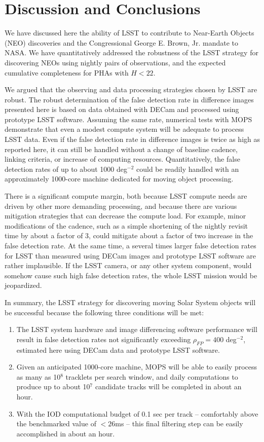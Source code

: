 

\section{Discussion and Conclusions\label{sec:discussion}}

We have discussed here the ability of LSST to contribute to Near-Earth Objects (NEO) discoveries and
the Congressional George E. Brown, Jr. mandate to NASA. We have quantitatively addressed
the robustness of the LSST strategy for discovering NEOs using nightly pairs of observations, and
the expected cumulative completeness for PHAs with $H<22$.

We argued that the observing and data processing strategies chosen by LSST are robust. The
robust determination of the false detection rate in difference images presented here is based
on data obtained with DECam and processed using prototype LSST software. Assuming the same rate,
numerical tests with MOPS demonstrate that even a modest compute system will be adequate to
process LSST data. Even if the false detection rate in difference images is twice as high as
reported here, it can still be handled without a change of baseline cadence, linking criteria, or
increase of computing resources. Quantitatively, the false detection rates of up to about
1000 deg$^{-2}$ could be readily handled with an approximately 1000-core machine dedicated for
moving object processing.

There is a significant compute margin, both because LSST compute needs are driven by other more
demanding processing, and because there are various mitigation strategies that can decrease the
compute load. For example, minor modifications of the cadence, such as a simple shortening
of the nightly revisit time by about a factor of 3, could mitigate about a factor of two increase in
the false detection rate. At the same time, a several times larger false detection rates for LSST
than measured using DECam images and prototype LSST software are rather implausible. If the
LSST camera, or any other system component, would somehow cause such high false detection rates,
the whole LSST mission would be jeopardized.

In summary, the LSST strategy for discovering moving Solar System objects will be successful
because the following three conditions will be met:
\begin{enumerate}
\item The LSST system hardware and image differencing software performance will result in false detection
          rates not significantly exceeding $\rho_{FP} =  400$ deg$^{-2}$, estimated here using DECam data
          and prototype LSST software.
\item Given an anticipated 1000-core machine, MOPS will be able to easily process as many as
         10$^8$ tracklets per search window, and daily computations to produce up to about 10$^7$
         candidate tracks will be completed in about an hour.
\item With the IOD computational budget of 0.1 sec per track -- comfortably above the benchmarked value of $<26$ms -- this final filtering step can
         be easily accomplished in about an hour.
\end{enumerate}


